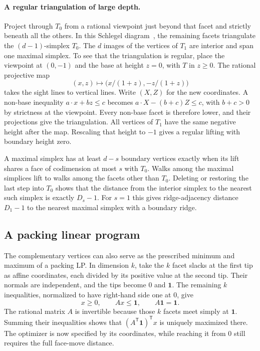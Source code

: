 \paragraph{A regular triangulation of large depth.}
Project through $T_0$ from a rational viewpoint just beyond that facet
and strictly beneath all the others. In this Schlegel diagram~\cite{ziegler},
the remaining facets triangulate the $(d-1)$-simplex $T_0$. The
$d$ images of the vertices of $T_1$ are interior and span one maximal
simplex. To see that the triangulation is regular, place the viewpoint
at $(0,-1)$ and the base at height $z=0$, with $T$ in $z\ge0$.
The rational projective map
\[
       (x,z)\longmapsto \bigl(x/(1+z),-z/(1+z)\bigr)
\]
takes the sight lines to vertical lines. Write $(X,Z)$ for the new
coordinates. A non-base inequality $a\cdot x+bz\le c$ becomes
$a\cdot X-(b+c)Z\le c$, with $b+c>0$ by strictness at the viewpoint.
Every non-base facet is therefore lower, and their projections give the
triangulation. All vertices of
$T_1$ have the same negative height after the map. Rescaling that height
to $-1$ gives a regular lifting with boundary height zero.

A maximal simplex has at least $d-s$ boundary vertices exactly when
its lift shares a face of codimension at most $s$ with $T_0$. Walks among the maximal simplices lift to walks
among the facets other than $T_0$. Deleting or restoring the last
step into $T_0$ shows that the distance from the interior simplex to
the nearest such simplex is exactly $D_s-1$. For $s=1$ this gives
ridge-adjacency distance $D_1-1$ to the nearest maximal simplex with a
boundary ridge.

\subsection{A packing linear program}

The complementary vertices can also serve as the prescribed minimum
and maximum of a packing LP. In dimension $k$, take the $k$ facet
slacks at the first tip as affine coordinates, each divided by its
positive value at the second tip. Their normals are independent, and
the tips become $0$ and $\mathbf1$. The remaining $k$ inequalities,
normalized to have right-hand side one at $0$, give
\[
          x\ge0,\qquad Ax\le\mathbf1,\qquad A\mathbf1=\mathbf1 .
\]
The rational matrix $A$ is invertible because those $k$ facets meet
simply at $\mathbf1$. Summing their inequalities shows that
$(A^{\mathsf T}\mathbf1)^{\mathsf T}x$ is uniquely maximized there.
The optimizer is now specified by its coordinates, while reaching
it from $0$ still requires the full face-move distance.

